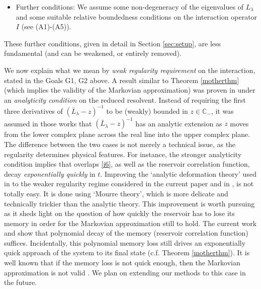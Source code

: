 \documentclass[letterpaper,onecolumn,11pt,accepted=2021-12-09]{quantumarticle}
\numberwithin{equation}{section}
\begin{document}
\begin{itemize}
	\item Further conditions: We assume some non-degeneracy of the eigenvalues of $L_\lambda$ and some suitable relative boundedness conditions on the interaction operator $I$ (see (A1)-(A5)). 
\end{itemize}
These further conditions, given in detail in Section \ref{sec:setup}, are less fundamental (and can be weakened, or entirely removed). 
\medskip






We now explain what we mean by {\em weak regularity requirement} on the interaction, stated in the Goals G1, G2 above. A result similar to Theorem \ref{motherthm} (which implies the validity of the Markovian approximation) was proven in \cite{KM2,MAOP} under an {\em analyticity condition} on the reduced resolvent. Instead of requiring the first three derivatives of $(\bar L_\lambda-z)^{-1}$ to be (weakly) bounded in $z\in{\mathbb C}_-$, it was assumed in those works that $(\bar L_\lambda-z)^{-1}$ has an analytic  extension as $z$ moves from the lower complex plane across the real line into the upper complex plane. The difference between the two cases is not merely a technical issue, as the regularity determines physical features. For instance, the stronger analyticity condition implies that overlaps \eqref{i6}, as well as the reservoir correlation function, decay {\em exponentially quickly} in $t$.  Improving the `analytic deformation theory' used in \cite{KM1,KM2,MAOP} to the weaker regularity regime considered in the current paper and in \cite{Markov2}, is not totally easy. It is done using `Mourre theory', which is more delicate and technically trickier than the analytic theory. This improvement is worth pursuing as it sheds light on the question of how quickly the reservoir has to lose its memory in order for the Markovian approximation still to hold. The current work and \cite{Markov2} show that polynomial decay of the memory (reservoir correlation function) suffices. Incidentally, this polynomial memory loss still drives an exponentially quick approach of the system to its final state (c.f. Theorem \ref{motherthm}). It is well known that if the memory loss is not quick enough, then the Markovian approximation is not valid \cite{Rivas,RivasMME,Li}. We plan on extending our methods to this case in the future.
\end{document}
